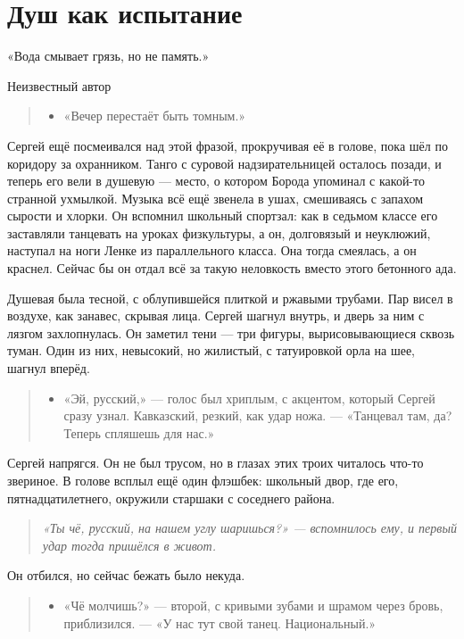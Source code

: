 \documentclass[12pt,a4paper]{book}
\newenvironment{dialogue}{\begin{quote}\itshape\begin{itemize}\item[]}{\end{itemize}\end{quote}}
\newenvironment{innerthought}{\begin{quote}\small\itshape}{\end{quote}}
\begin{document}
\chapter{Душ как испытание}
\epigraph{«Вода смывает грязь, но не память.»}{Неизвестный автор}

\begin{dialogue}
    «Вечер перестаёт быть томным.»
\end{dialogue}

Сергей ещё посмеивался над этой фразой, прокручивая её в голове, пока шёл по коридору за охранником. Танго с суровой надзирательницей осталось позади, и теперь его вели в душевую --- место, о котором Борода упоминал с какой-то странной ухмылкой. Музыка всё ещё звенела в ушах, смешиваясь с запахом сырости и хлорки. Он вспомнил школьный спортзал: как в седьмом классе его заставляли танцевать на уроках физкультуры, а он, долговязый и неуклюжий, наступал на ноги Ленке из параллельного класса. Она тогда смеялась, а он краснел. Сейчас бы он отдал всё за такую неловкость вместо этого бетонного ада.

Душевая была тесной, с облупившейся плиткой и ржавыми трубами. Пар висел в воздухе, как занавес, скрывая лица. Сергей шагнул внутрь, и дверь за ним с лязгом захлопнулась. Он заметил тени --- три фигуры, вырисовывающиеся сквозь туман. Один из них, невысокий, но жилистый, с татуировкой орла на шее, шагнул вперёд.

\begin{dialogue}
«Эй, русский,» --- голос был хриплым, с акцентом, который Сергей сразу узнал. Кавказский, резкий, как удар ножа. --- «Танцевал там, да? Теперь спляшешь для нас.»
\end{dialogue}

Сергей напрягся. Он не был трусом, но в глазах этих троих читалось что-то звериное. В голове всплыл ещё один флэшбек: школьный двор, где его, пятнадцатилетнего, окружили старшаки с соседнего района.

\begin{innerthought}
«Ты чё, русский, на нашем углу шаришься?» --- вспомнилось ему, и первый удар тогда пришёлся в живот. 
\end{innerthought}
Он отбился, но сейчас бежать было некуда.

\begin{dialogue}
«Чё молчишь?» --- второй, с кривыми зубами и шрамом через бровь, приблизился. --- «У нас тут свой танец. Национальный.»
\end{dialogue}
\end{document}

